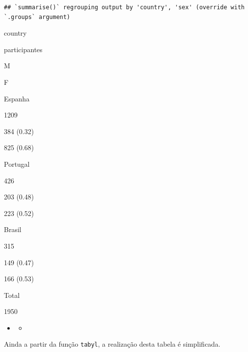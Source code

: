 \documentclass[
]{book}
\newenvironment{Shaded}{\begin{snugshade}}{\end{snugshade}}
\newcommand{\DataTypeTok}[1]{\textcolor[rgb]{0.13,0.29,0.53}{#1}}
\newcommand{\DecValTok}[1]{\textcolor[rgb]{0.00,0.00,0.81}{#1}}
\newcommand{\KeywordTok}[1]{\textcolor[rgb]{0.13,0.29,0.53}{\textbf{#1}}}
\newcommand{\NormalTok}[1]{#1}
\newcommand{\OperatorTok}[1]{\textcolor[rgb]{0.81,0.36,0.00}{\textbf{#1}}}
\newcommand{\StringTok}[1]{\textcolor[rgb]{0.31,0.60,0.02}{#1}}
\begin{document}
\begin{verbatim}
## `summarise()` regrouping output by 'country', 'sex' (override with `.groups` argument)
\end{verbatim}

country

participantes

M

F

Espanha

1209

384 (0.32)

825 (0.68)

Portugal

426

203 (0.48)

223 (0.52)

Brasil

315

149 (0.47)

166 (0.53)

Total

1950

\begin{itemize}
\item
  \begin{itemize}
  \item
  \end{itemize}
\end{itemize}

Ainda a partir da função \texttt{tabyl}, a realização desta tabela é simplificada.

\begin{Shaded}
\end{Shaded}
\end{document}
